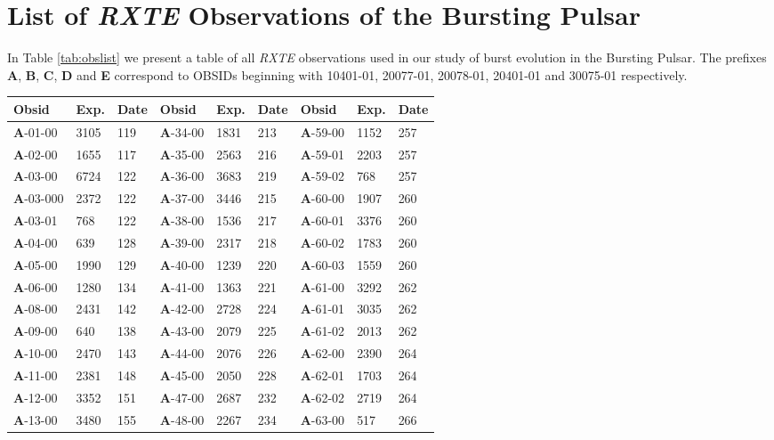 \chapter{List of \textit{RXTE} Observations of the Bursting Pulsar}
\label{app:obs}

\par In Table \ref{tab:obslist} we present a table of all \textit{RXTE} observations used in our study of burst evolution in the Bursting Pulsar.  The prefixes \textbf{A}, \textbf{B}, \textbf{C}, \textbf{D} and \textbf{E} correspond to OBSIDs beginning with 10401-01, 20077-01, 20078-01, 20401-01 and 30075-01 respectively.

\begin{table*}
\centering
\begin{tabular}{lllllllll}
\hline
\hline
\scriptsize Obsid&\scriptsize Exp.&\scriptsize Date&\scriptsize Obsid&\scriptsize Exp.&\scriptsize Date&\scriptsize Obsid&\scriptsize Exp.&\scriptsize Date\\
\hline
\textbf{A}-01-00&3105&119&\textbf{A}-34-00&1831&213&\textbf{A}-59-00&1152&257\\
\textbf{A}-02-00&1655&117&\textbf{A}-35-00&2563&216&\textbf{A}-59-01&2203&257\\
\textbf{A}-03-00&6724&122&\textbf{A}-36-00&3683&219&\textbf{A}-59-02&768&257\\
\textbf{A}-03-000&2372&122&\textbf{A}-37-00&3446&215&\textbf{A}-60-00&1907&260\\
\textbf{A}-03-01&768&122&\textbf{A}-38-00&1536&217&\textbf{A}-60-01&3376&260\\
\textbf{A}-04-00&639&128&\textbf{A}-39-00&2317&218&\textbf{A}-60-02&1783&260\\
\textbf{A}-05-00&1990&129&\textbf{A}-40-00&1239&220&\textbf{A}-60-03&1559&260\\
\textbf{A}-06-00&1280&134&\textbf{A}-41-00&1363&221&\textbf{A}-61-00&3292&262\\
\textbf{A}-08-00&2431&142&\textbf{A}-42-00&2728&224&\textbf{A}-61-01&3035&262\\
\textbf{A}-09-00&640&138&\textbf{A}-43-00&2079&225&\textbf{A}-61-02&2013&262\\
\textbf{A}-10-00&2470&143&\textbf{A}-44-00&2076&226&\textbf{A}-62-00&2390&264\\
\textbf{A}-11-00&2381&148&\textbf{A}-45-00&2050&228&\textbf{A}-62-01&1703&264\\
\textbf{A}-12-00&3352&151&\textbf{A}-47-00&2687&232&\textbf{A}-62-02&2719&264\\
\textbf{A}-13-00&3480&155&\textbf{A}-48-00&2267&234&\textbf{A}-63-00&517&266\\

\end{tabular}
\end{table*}

